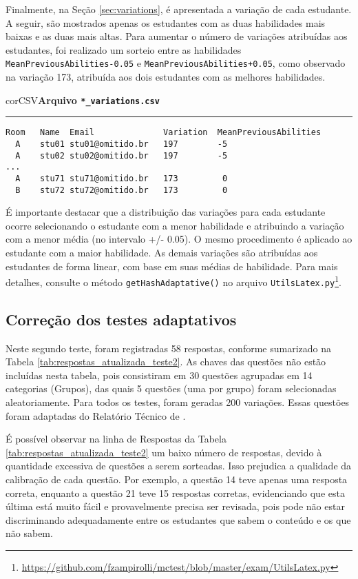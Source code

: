 Finalmente, na Seção \ref{sec:variations}, é apresentada a variação de cada estudante. A seguir, são mostrados apenas os estudantes com as duas habilidades mais baixas e as duas mais altas. Para aumentar o número de variações atribuídas aos estudantes, foi realizado um sorteio entre as habilidades \texttt{MeanPreviousAbilities-0.05} e \texttt{MeanPreviousAbilities+0.05}, como observado na variação 173, atribuída aos dois estudantes com as melhores habilidades.

\begin{myboxCode}{corCSV}{\textbf{Arquivo \texttt{*\_variations.csv}}}\vspace{3mm}
\hrule
\begin{verbatim}
Room   Name  Email              Variation  MeanPreviousAbilities
  A    stu01 stu01@omitido.br   197        -5
  A    stu02 stu02@omitido.br   197        -5
... 
  A    stu71 stu71@omitido.br   173         0
  B    stu72 stu72@omitido.br   173         0
\end{verbatim}
\end{myboxCode}

É importante destacar que a distribuição das variações para cada estudante ocorre selecionando o estudante com a menor habilidade e atribuindo a variação com a menor média (no intervalo +/- 0.05). O mesmo procedimento é aplicado ao estudante com a maior habilidade. As demais variações são atribuídas aos estudantes de forma linear, com base em suas médias de habilidade. Para mais detalhes, consulte o método \texttt{getHashAdaptative()} no arquivo \texttt{UtilsLatex.py}\footnote{\url{https://github.com/fzampirolli/mctest/blob/master/exam/UtilsLatex.py}}.

\subsection{Correção dos testes adaptativos}

Neste segundo teste, foram registradas 58 respostas, conforme sumarizado na Tabela \ref{tab:respostas_atualizada_teste2}. As chaves das questões não estão incluídas nesta tabela, pois consistiram em 30 questões agrupadas em 14 categorias (Grupos), das quais 5 questões (uma por grupo) foram selecionadas aleatoriamente. Para todos os testes, foram geradas 200 variações. Essas questões foram adaptadas do Relatório Técnico de .

É possível observar na linha de Respostas da Tabela \ref{tab:respostas_atualizada_teste2} um baixo número de respostas, devido à quantidade excessiva de questões a serem sorteadas. Isso prejudica a qualidade da calibração de cada questão. Por exemplo, a questão 14 teve apenas uma resposta correta, enquanto a questão 21 teve 15 respostas corretas, evidenciando que esta última está muito fácil e provavelmente precisa ser revisada, pois pode não estar discriminando adequadamente entre os estudantes que sabem o conteúdo e os que não sabem.

